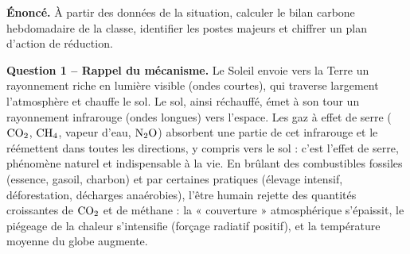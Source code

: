 \documentclass[11pt]{article}
\newcommand{\cle}[1]{{\popxbold\color{popdark}#1}}
\begin{document}
\begin{exoresolu}
\textbf{Énoncé.} À partir des données de la situation, calculer le bilan carbone hebdomadaire de la classe, identifier les postes majeurs et chiffrer un plan d'action de réduction.

\tcblower

\textbf{Question 1 -- Rappel du mécanisme.} Le Soleil envoie vers la Terre un rayonnement riche en lumière visible (ondes courtes), qui traverse largement l'atmosphère et chauffe le sol. Le sol, ainsi réchauffé, émet à son tour un rayonnement infrarouge (ondes longues) vers l'espace. Les gaz à effet de serre ($\ce{CO2}$, $\ce{CH4}$, vapeur d'eau, $\ce{N2O}$) absorbent une partie de cet infrarouge et le réémettent dans toutes les directions, y compris vers le sol : c'est l'\cle{effet de serre}, phénomène naturel et indispensable à la vie. En brûlant des combustibles fossiles (essence, gasoil, charbon) et par certaines pratiques (élevage intensif, déforestation, décharges anaérobies), l'être humain rejette des quantités croissantes de $\ce{CO2}$ et de méthane : la « couverture » atmosphérique s'épaissit, le piégeage de la chaleur s'intensifie (forçage radiatif positif), et la température moyenne du globe augmente.


\end{exoresolu}
\end{document}

